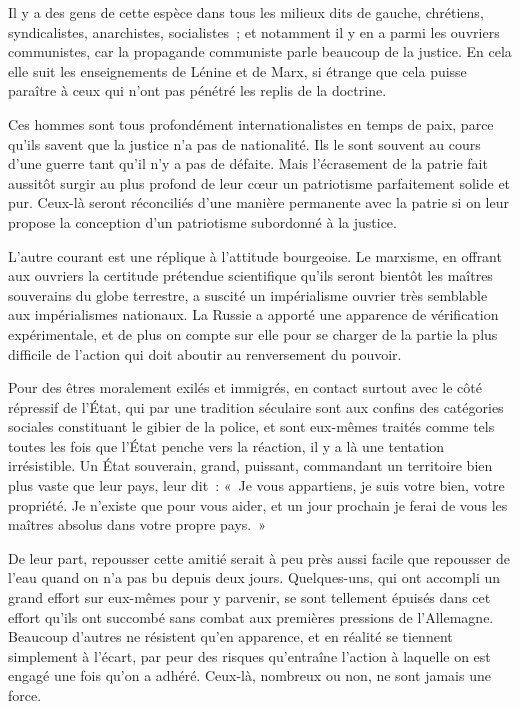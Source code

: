 \documentclass[french,twoside]{book} %
\begin{document}
Il y a des gens de cette espèce dans tous les milieux dits de gauche, chrétiens, syndicalistes, anarchistes, socialistes ; et notamment il y en a parmi les ouvriers communistes, car la propagande communiste parle beaucoup de la justice. En cela elle suit les enseignements de Lénine et de Marx, si étrange que cela puisse paraître à ceux qui n'ont pas pénétré les replis de la doctrine.\par
Ces hommes sont tous profondément internationalistes en temps de paix, parce qu'ils savent que la justice n'a pas de nationalité. Ils le sont souvent au cours d'une guerre tant qu'il n'y a pas de défaite. Mais l'écrasement de la patrie fait aussitôt surgir au plus profond de leur cœur un patriotisme parfaitement solide et pur. Ceux-là seront réconciliés d'une manière permanente avec la patrie si on leur propose la conception d'un patriotisme subordonné à la justice.\par
L'autre courant est une réplique à l'attitude bourgeoise. Le marxisme, en offrant aux ouvriers la certitude prétendue scientifique qu'ils seront bientôt les maîtres souverains du globe terrestre, a suscité un impérialisme ouvrier très semblable aux impérialismes nationaux. La Russie a apporté une apparence de vérification expérimentale, et de plus on compte sur elle pour se charger de la partie la plus difficile de l'action qui doit aboutir au renversement du pouvoir.\par
Pour des êtres moralement exilés et immigrés, en contact surtout avec le côté répressif de l'État, qui par une tradition séculaire sont aux confins des catégories sociales constituant le gibier de la police, et sont eux-mêmes traités comme tels toutes les fois que l'État penche vers la réaction, il y a là une tentation irrésistible. Un État souverain, grand, puissant, commandant un territoire bien plus vaste que leur pays, leur dit : « Je vous appartiens, je suis votre bien, votre propriété. Je n'existe que pour vous aider, et un jour prochain je ferai de vous les maîtres absolus dans votre propre pays. »\par
De leur part, repousser cette amitié serait à peu près aussi facile que repousser de l'eau quand on n'a pas bu depuis deux jours. Quelques-uns, qui ont accompli un grand effort sur eux-mêmes pour y parvenir, se sont tellement épuisés dans cet effort qu'ils ont succombé sans combat aux premières pressions de l'Allemagne. Beaucoup d'autres ne résistent qu'en apparence, et en réalité se tiennent simplement à l'écart, par peur des risques qu'entraîne l'action à laquelle on est engagé une fois qu'on a adhéré. Ceux-là, nombreux ou non, ne sont jamais une force.\par
\end{document}
